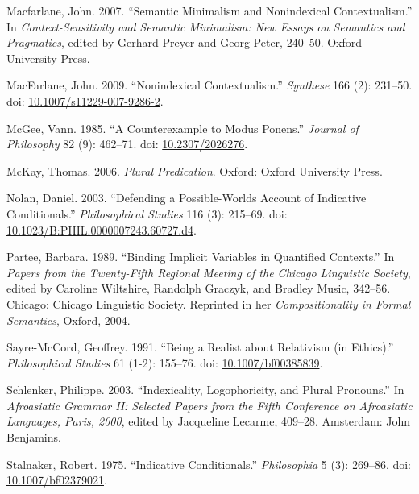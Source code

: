 \documentclass[
  11pt,
  letterpaper,
  DIV=11,
  numbers=noendperiod,
  twoside]{scrartcl}
\newlength{\cslhangindent}
\newenvironment{CSLReferences}[2] %
 {\begin{list}{}{%
  \setlength{\itemindent}{0pt}
  \setlength{\leftmargin}{0pt}
  \setlength{\parsep}{0pt}
  \ifodd #1
   \setlength{\leftmargin}{\cslhangindent}
   \setlength{\itemindent}{-1\cslhangindent}
  \fi
  \setlength{\itemsep}{#2\baselineskip}}}
 {\end{list}}
\begin{document}
\begin{CSLReferences}{1}{0}
Macfarlane, John. 2007. {``Semantic Minimalism and Nonindexical
Contextualism.''} In \emph{Context-Sensitivity and Semantic Minimalism:
New Essays on Semantics and Pragmatics}, edited by Gerhard Preyer and
Georg Peter, 240--50. Oxford University Press.

MacFarlane, John. 2009. {``{Nonindexical Contextualism}.''}
\emph{Synthese} 166 (2): 231--50. doi:
\href{https://doi.org/10.1007/s11229-007-9286-2}{10.1007/s11229-007-9286-2}.

McGee, Vann. 1985. {``A Counterexample to Modus Ponens.''} \emph{Journal
of Philosophy} 82 (9): 462--71. doi:
\href{https://doi.org/10.2307/2026276}{10.2307/2026276}.

McKay, Thomas. 2006. \emph{Plural Predication}. Oxford: Oxford
University Press.

Nolan, Daniel. 2003. {``{Defending a Possible-Worlds Account of
Indicative Conditionals}.''} \emph{Philosophical Studies} 116 (3):
215--69. doi:
\href{https://doi.org/10.1023/B:PHIL.0000007243.60727.d4}{10.1023/B:PHIL.0000007243.60727.d4}.

Partee, Barbara. 1989. {``Binding Implicit Variables in Quantified
Contexts.''} In \emph{Papers from the Twenty-Fifth Regional Meeting of
the Chicago Linguistic Society}, edited by Caroline Wiltshire, Randolph
Graczyk, and Bradley Music, 342--56. Chicago: Chicago Linguistic
Society. Reprinted in her \emph{Compositionality in Formal Semantics},
Oxford, 2004.

Sayre-McCord, Geoffrey. 1991. {``Being a Realist about Relativism (in
Ethics).''} \emph{Philosophical Studies} 61 (1-2): 155--76. doi:
\href{https://doi.org/10.1007/bf00385839}{10.1007/bf00385839}.

Schlenker, Philippe. 2003. {``Indexicality, Logophoricity, and Plural
Pronouns.''} In \emph{Afroasiatic Grammar II: Selected Papers from the
Fifth Conference on Afroasiatic Languages, Paris, 2000}, edited by
Jacqueline Lecarme, 409--28. Amsterdam: John Benjamins.

Stalnaker, Robert. 1975. {``{Indicative Conditionals}.''}
\emph{Philosophia} 5 (3): 269--86. doi:
\href{https://doi.org/10.1007/bf02379021}{10.1007/bf02379021}.


\end{CSLReferences}
\end{document}
